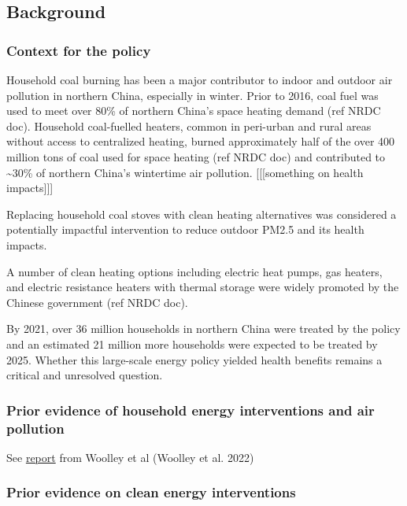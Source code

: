 \documentclass[
  letterpaper,
  DIV=11,
  numbers=noendperiod]{scrartcl}
\begin{document}
\subsection{Background}\label{background}

\subsubsection{Context for the policy}\label{context-for-the-policy}

Household coal burning has been a major contributor to indoor and
outdoor air pollution in northern China, especially in winter. Prior to
2016, coal fuel was used to meet over 80\% of northern China's space
heating demand (ref NRDC doc). Household coal-fuelled heaters, common in
peri-urban and rural areas without access to centralized heating, burned
approximately half of the over 400 million tons of coal used for space
heating (ref NRDC doc) and contributed to \textasciitilde30\% of
northern China's wintertime air pollution. {[}{[}{[}something on health
impacts{]}{]}{]}

Replacing household coal stoves with clean heating alternatives was
considered a potentially impactful intervention to reduce outdoor PM2.5
and its health impacts.

A number of clean heating options including electric heat pumps, gas
heaters, and electric resistance heaters with thermal storage were
widely promoted by the Chinese government (ref NRDC doc).

By 2021, over 36 million households in northern China were treated by
the policy and an estimated 21 million more households were expected to
be treated by 2025. Whether this large-scale energy policy yielded
health benefits remains a critical and unresolved question.

\subsubsection{Prior evidence of household energy interventions and air
pollution}\label{prior-evidence-of-household-energy-interventions-and-air-pollution}

See
\href{https://onlinelibrary.wiley.com/doi/epdf/10.1111/ina.12958}{report}
from Woolley et al (Woolley et al. 2022)

\subsubsection{Prior evidence on clean energy
interventions}\label{prior-evidence-on-clean-energy-interventions}
\end{document}
